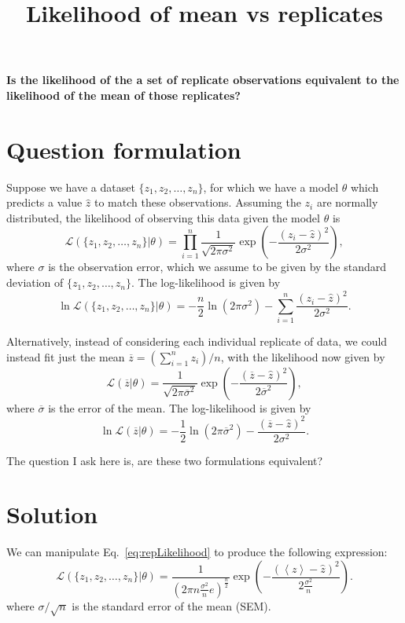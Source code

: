 \documentclass[a4paper,11pt]{article}
\title{Likelihood of mean vs replicates}
\subtitle{}
\newcommand{\avg}[1]{\left\langle #1 \right\rangle}
\begin{document}
\maketitlebox

\textbf{Is the likelihood of the a set of replicate observations equivalent to the likelihood of the mean of those replicates?}

\section*{Question formulation}
Suppose we have a dataset $\{z_1,z_2,\dots,z_n\}$, for which we have a model $\theta$ which predicts a value $\widehat{z}$ to match these observations.
Assuming the $z_i$ are normally distributed, the likelihood of observing this data given the model $\theta$ is
\begin{equation}
\mathcal{L}(\{z_1,z_2,\dots,z_n\} | \theta) = \prod_{i=1}^n \frac{1}{\sqrt{2\pi\sigma^2}}\exp\left(-\frac{(z_i - \widehat{z})^2}{2\sigma^2}\right), \label{eq:repLikelihood}
\end{equation}
where $\sigma$ is the observation error, which we assume to be given by the standard deviation of $\{z_1,z_2,\dots,z_n\}$.
The log-likelihood is given by
\begin{equation}
\ln \mathcal{L}(\{z_1,z_2,\dots,z_n\} | \theta) = -\frac{n}{2}\ln(2\pi\sigma^2) - \sum_{i=1}^n\frac{(z_i - \widehat{z})^2}{2\sigma^2}. \nonumber
\end{equation}

Alternatively, instead of considering each individual replicate of data, we could instead fit just the mean $\overline{z} = (\sum_{i=1}^n z_i)/n$, with the likelihood now given by
\begin{equation}
\mathcal{L}(\overline{z} | \theta) = \frac{1}{\sqrt{2\pi\overline{\sigma}^2}}\exp\left(-\frac{(\overline{z} - \widehat{z})^2}{2\overline{\sigma}^2}\right), \label{eq:meanLikelihood}
\end{equation}
where $\overline{\sigma}$ is the error of the mean.
The log-likelihood is given by
\begin{equation}
\ln \mathcal{L}(\overline{z} | \theta) = -\frac{1}{2}\ln(2\pi\overline{\sigma}^2) - \frac{(\overline{z} - \widehat{z})^2}{2\sigma^2}. \nonumber
\end{equation}

The question I ask here is, are these two formulations equivalent?

\section*{Solution}
We can manipulate Eq.~\eqref{eq:repLikelihood} to produce the following expression:
\begin{equation}
\mathcal{L}(\{z_1,z_2,\dots,z_n\} | \theta) = \dfrac{1}{\left(2\pi n\frac{\sigma^2}{n} e\right)^{\frac{n}{2}}} \exp\left(-\dfrac{(\avg{z} - \widehat{z})^2}{2\frac{\sigma^2}{n}}\right).
\end{equation}
where $\sigma/\sqrt{n}$ is the standard error of the mean (SEM).
\end{document}
